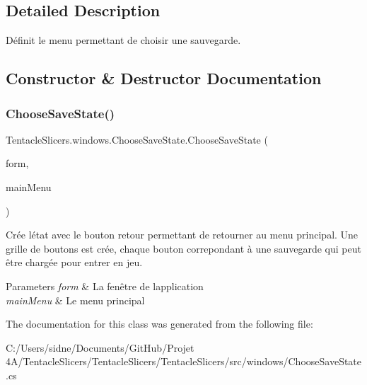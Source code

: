 \subsection{Detailed Description}
Définit le menu permettant de choisir une sauvegarde. 



\subsection{Constructor \& Destructor Documentation}
\mbox{\label{class_tentacle_slicers_1_1windows_1_1_choose_save_state_ac55569512099d6f62acdea0dcab46012}} 
\subsubsection{\texorpdfstring{Choose\+Save\+State()}{ChooseSaveState()}}
{\footnotesize\ttfamily Tentacle\+Slicers.\+windows.\+Choose\+Save\+State.\+Choose\+Save\+State (\begin{DoxyParamCaption}\item[{\hyperlink{class_tentacle_slicers_1_1windows_1_1_main_form}{Main\+Form}}]{form,  }\item[{\hyperlink{class_tentacle_slicers_1_1windows_1_1_windows_state}{Windows\+State}}]{main\+Menu }\end{DoxyParamCaption})}



Crée l\textquotesingle{}état avec le bouton retour permettant de retourner au menu principal. Une grille de boutons est crée, chaque bouton correpondant à une sauvegarde qui peut être chargée pour entrer en jeu. 


\begin{DoxyParams}{Parameters}
{\em form} & La fenêtre de l\textquotesingle{}application \\
\hline
{\em main\+Menu} & Le menu principal \\
\hline
\end{DoxyParams}


The documentation for this class was generated from the following file\+:\begin{DoxyCompactItemize}
\item 
C\+:/\+Users/sidne/\+Documents/\+Git\+Hub/\+Projet 4\+A/\+Tentacle\+Slicers/\+Tentacle\+Slicers/\+Tentacle\+Slicers/src/windows/Choose\+Save\+State.\+cs\end{DoxyCompactItemize}
